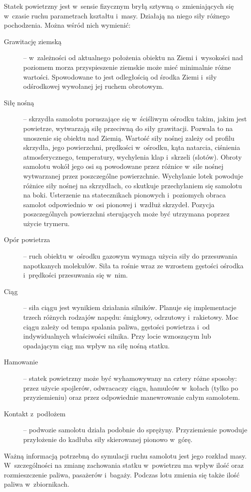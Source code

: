 \documentclass{mwrep}
\begin{document}
Statek powietrzny jest w~sensie fizycznym bryłą sztywną o~zmieniających się w~czasie ruchu parametrach kształtu i~masy. Działają na niego siły różnego pochodzenia. Można wśród nich wymienić:
\begin{description}
\item[Grawitację ziemską] -- w~zależności od aktualnego położenia obiektu na Ziemi i~wysokości nad poziomem morza przyspieszenie ziemskie może mieć minimalnie różne wartości. Spowodowane to jest odległością od środka Ziemi i~siły odśrodkowej wywołanej jej ruchem obrotowym.
\item[Siłę nośną] -- skrzydła samolotu poruszające się w~ściśliwym ośrodku takim, jakim jest powietrze, wytwarzają siłę przeciwną do siły grawitacji. Pozwala to na unoszenie się obiektu nad Ziemią. Wartość siły nośnej zależy od profilu skrzydła, jego powierzchni, prędkości w~ośrodku, kąta natarcia, ciśnienia atmosferycznego, temperatury, wychylenia klap i~skrzeli (slotów). Obroty samolotu wokół jego osi są powodowane przez różnice w~sile nośnej wytwarzanej przez poszczególne powierzchnie. Wychylanie lotek powoduje różnice siły nośnej na skrzydłach, co skutkuje przechylaniem się samolotu na boki. Usterzenie na statecznikach pionowych i~poziomych obraca samolot odpowiednio w~osi pionowej i~wzdłuż skrzydeł. Pozycja poszczególnych powierzchni sterujących może być utrzymana poprzez użycie trymeru.
\item[Opór powietrza] -- ruch obiektu w~ośrodku gazowym wymaga użycia siły do przesuwania napotkanych molekułów. Siła ta rośnie wraz ze wzrostem gęstości ośrodka i~prędkości przesuwania się w~nim.
\item[Ciąg] -- siła ciągu jest wynikiem działania silników. Planuje się implementacje trzech różnych rodzajów napędu: śmigłowy, odrzutowy i~rakietowy. Moc ciągu zależy od tempa spalania paliwa, gęstości powietrza i~od indywidualnych właściwości silnika. Przy locie wznoszącym lub opadającym ciąg ma wpływ na siłę nośną statku.
\item[Hamowanie] -- statek powietrzny może być wyhamowywany na cztery różne sposoby: przez użycie spojlerów, odwracaczy ciągu, hamulców w~kołach (tylko po przyziemieniu) oraz przez odpowiednie manewrowanie całym samolotem.
\item[Kontakt z~podłożem] -- podwozie samolotu działa podobnie do sprężyny. Przyziemienie powoduje przyłożenie do kadłuba siły skierowanej pionowo w~górę.
\end{description}

\vspace*{\baselineskip}
Ważną informacją potrzebną do symulacji ruchu samolotu jest jego rozkład masy. W~szczególności na zmianę zachowania statku w~powietrzu ma wpływ ilość oraz rozmieszczenie paliwa, pasażerów i~bagaży. Podczas lotu zmienia się także ilość paliwa w~zbiornikach.
\end{document}

